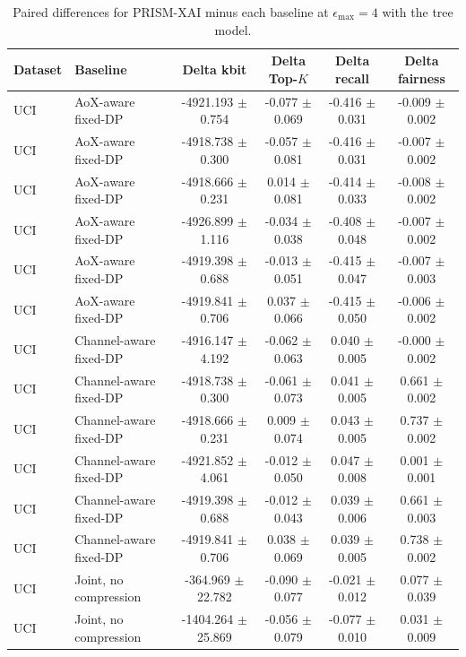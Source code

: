 \begin{table}[t]
\caption{Paired differences for PRISM-XAI minus each baseline at $\epsilon_{\max}=4$ with the tree model.}
\label{tab:paired-differences}
\centering
\scriptsize
\setlength{\tabcolsep}{3pt}
\begin{tabular}{llcccc}
\toprule
Dataset & Baseline & Delta kbit & Delta Top-$K$ & Delta recall & Delta fairness \\
\midrule
UCI & AoX-aware fixed-DP & -4921.193 $\pm$ 0.754 & -0.077 $\pm$ 0.069 & -0.416 $\pm$ 0.031 & -0.009 $\pm$ 0.002 \\
UCI & AoX-aware fixed-DP & -4918.738 $\pm$ 0.300 & -0.057 $\pm$ 0.081 & -0.416 $\pm$ 0.031 & -0.007 $\pm$ 0.002 \\
UCI & AoX-aware fixed-DP & -4918.666 $\pm$ 0.231 & 0.014 $\pm$ 0.081 & -0.414 $\pm$ 0.033 & -0.008 $\pm$ 0.002 \\
UCI & AoX-aware fixed-DP & -4926.899 $\pm$ 1.116 & -0.034 $\pm$ 0.038 & -0.408 $\pm$ 0.048 & -0.007 $\pm$ 0.002 \\
UCI & AoX-aware fixed-DP & -4919.398 $\pm$ 0.688 & -0.013 $\pm$ 0.051 & -0.415 $\pm$ 0.047 & -0.007 $\pm$ 0.003 \\
UCI & AoX-aware fixed-DP & -4919.841 $\pm$ 0.706 & 0.037 $\pm$ 0.066 & -0.415 $\pm$ 0.050 & -0.006 $\pm$ 0.002 \\
UCI & Channel-aware fixed-DP & -4916.147 $\pm$ 4.192 & -0.062 $\pm$ 0.063 & 0.040 $\pm$ 0.005 & -0.000 $\pm$ 0.002 \\
UCI & Channel-aware fixed-DP & -4918.738 $\pm$ 0.300 & -0.061 $\pm$ 0.073 & 0.041 $\pm$ 0.005 & 0.661 $\pm$ 0.002 \\
UCI & Channel-aware fixed-DP & -4918.666 $\pm$ 0.231 & 0.009 $\pm$ 0.074 & 0.043 $\pm$ 0.005 & 0.737 $\pm$ 0.002 \\
UCI & Channel-aware fixed-DP & -4921.852 $\pm$ 4.061 & -0.012 $\pm$ 0.050 & 0.047 $\pm$ 0.008 & 0.001 $\pm$ 0.001 \\
UCI & Channel-aware fixed-DP & -4919.398 $\pm$ 0.688 & -0.012 $\pm$ 0.043 & 0.039 $\pm$ 0.006 & 0.661 $\pm$ 0.003 \\
UCI & Channel-aware fixed-DP & -4919.841 $\pm$ 0.706 & 0.038 $\pm$ 0.069 & 0.039 $\pm$ 0.005 & 0.738 $\pm$ 0.002 \\
UCI & Joint, no compression & -364.969 $\pm$ 22.782 & -0.090 $\pm$ 0.077 & -0.021 $\pm$ 0.012 & 0.077 $\pm$ 0.039 \\
UCI & Joint, no compression & -1404.264 $\pm$ 25.869 & -0.056 $\pm$ 0.079 & -0.077 $\pm$ 0.010 & 0.031 $\pm$ 0.009 \\

\end{tabular}
\end{table}
